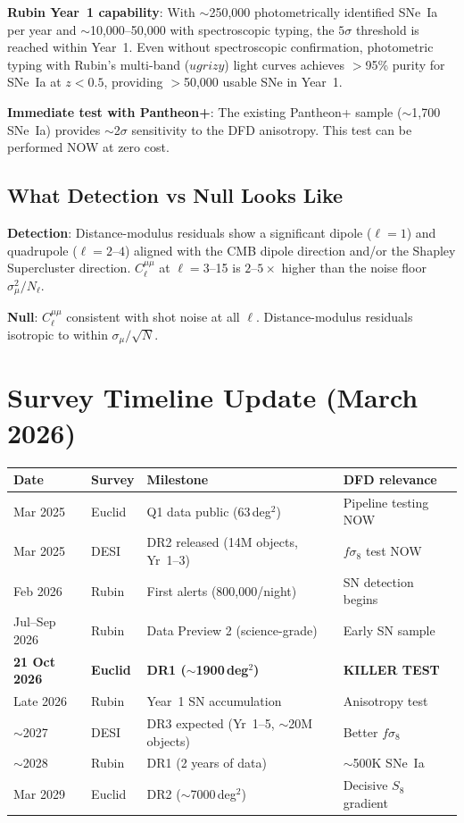 \documentclass[11pt,a4paper]{article}
\begin{document}
\textbf{Rubin Year~1 capability}: With $\sim$250,000 photometrically
identified SNe~Ia per year and $\sim$10,000--50,000 with spectroscopic
typing, the $5\sigma$ threshold is reached within Year~1.
Even without spectroscopic confirmation, photometric typing with
Rubin's multi-band ($ugrizy$) light curves achieves $>$95\% purity
for SNe~Ia at $z < 0.5$, providing $>$50,000 usable SNe in Year~1.

\textbf{Immediate test with Pantheon+}: The existing Pantheon+ sample
($\sim$1,700 SNe~Ia) provides $\sim$2$\sigma$ sensitivity to the
DFD anisotropy. This test can be performed NOW at zero cost.

\subsection{What Detection vs Null Looks Like}

\textbf{Detection}: Distance-modulus residuals show a significant
dipole ($\ell = 1$) and quadrupole ($\ell = 2$--$4$) aligned with
the CMB dipole direction and/or the Shapley Supercluster direction.
$C_\ell^{\mu\mu}$ at $\ell = 3$--15 is $2$--$5\times$ higher than
the noise floor $\sigma_\mu^2/N_\ell$.

\textbf{Null}: $C_\ell^{\mu\mu}$ consistent with shot noise at all
$\ell$. Distance-modulus residuals isotropic to within $\sigma_\mu/\sqrt{N}$.


\section{Survey Timeline Update (March 2026)}
\label{sec:timeline}

\begin{center}
\begin{tabular}{llp{6cm}l}
\toprule
\textbf{Date} & \textbf{Survey} & \textbf{Milestone}
  & \textbf{DFD relevance} \\
\midrule
Mar 2025 & Euclid & Q1 data public (63\,deg$^2$) & Pipeline testing NOW \\
Mar 2025 & DESI & DR2 released (14M objects, Yr~1--3) & $f\sigma_8$ test NOW \\
Feb 2026 & Rubin & First alerts (800,000/night) & SN detection begins \\
Jul--Sep 2026 & Rubin & Data Preview 2 (science-grade) & Early SN sample \\
\textbf{21 Oct 2026} & \textbf{Euclid} & \textbf{DR1 ($\sim$1900\,deg$^2$)}
  & \textbf{KILLER TEST} \\
Late 2026 & Rubin & Year~1 SN accumulation & Anisotropy test \\
$\sim$2027 & DESI & DR3 expected (Yr~1--5, $\sim$20M objects) & Better $f\sigma_8$ \\
$\sim$2028 & Rubin & DR1 (2 years of data) & $\sim$500K SNe~Ia \\
Mar 2029 & Euclid & DR2 ($\sim$7000\,deg$^2$) & Decisive $S_8$ gradient \\
\bottomrule
\end{tabular}
\end{center}
\end{document}
